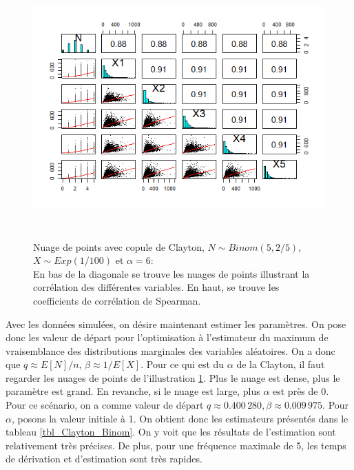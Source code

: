 \documentclass{article}
\begin{document}
	\begin{figure}[H]
		\centering
		\includegraphics[height=10cm]{Graph/scatterplot_Binom.png}
		\caption[Nuage de points avec copule de Clayton, $N\sim Binom(5, 2/5)$ et $X\sim Exp(1/100)$]{Nuage de points avec copule de Clayton, $N\sim Binom(5, 2/5)$, $X\sim Exp(1/100)$ et $\alpha = 6$: \\
			En bas de la diagonale se trouve les nuages de points illustrant la corrélation des différentes variables. En haut, se trouve les coefficients de corrélation de Spearman.} 
		\label{graph_scatterplot_Binom}
	\end{figure}
	
	
	
	
	Avec les données simulées, on désire maintenant estimer les paramètres. On pose donc les valeur de départ pour l'optimisation à l'estimateur du maximum de vraisemblance des distributions marginales des variables aléatoires. On a donc que $q \approx E[N]/n$, $\beta \approx 1/E[X]$. Pour ce qui est du $\alpha$ de la Clayton, il faut regarder les nuages de points de  l'illustration \ref{graph_scatterplot_Binom}. Plus le nuage est dense, plus le paramètre est grand. En revanche, si le nuage est large, plus $\alpha$ est près de 0.\\
	
	Pour ce scénario, on a comme valeur de départ $q \approx 0.400\,280, \beta \approx 0.009\,975$. Pour $\alpha$, posons la valeur initiale à 1. On obtient donc les estimateurs  présentés dans le tableau \ref{tbl_Clayton_Binom}. On y voit que les résultats de l'estimation sont relativement très précises. De plus, pour une fréquence maximale de 5, les temps de dérivation et d'estimation sont très rapides.
	
\end{document}
